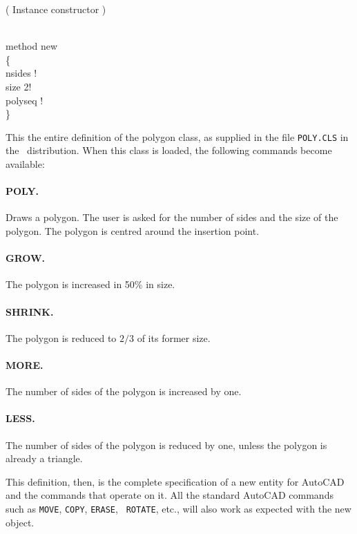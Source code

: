 \documentclass{article}
\begin{document}
{( Instance constructor )

\\
method new\\
\{\\
 nsides !\\
 size 2!\\
 polyseq !\\
\}
}

This the entire definition of the polygon class, as supplied in the
file {\tt POLY.CLS} in the \cw\ distribution.  When this class is
loaded, the following commands become available:

\paragraph{POLY.}  Draws a polygon.  The user is asked for the number
    of sides and the size of the polygon.  The polygon is centred
    around the insertion point.
\paragraph{GROW.}   The polygon is increased in 50\% in size.
\paragraph{SHRINK.} The polygon is reduced to $2/3$ of its former
    size.
\paragraph{MORE.}   The number of sides of the polygon is increased
    by one.
\paragraph{LESS.}   The number of sides of the polygon is reduced
    by one, unless the polygon is already a triangle.

This definition, then, is the complete specification of a new entity
for AutoCAD and the commands that operate on it.  All the standard
AutoCAD commands such as {\tt MOVE}, {\tt COPY}, {\tt ERASE}, {\tt
ROTATE}, etc., will also work as expected with the new object.
\end{document}
